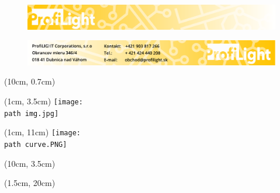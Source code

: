 \documentclass[a4paper, 12pt, onecolumn]{book}
\begin{document}
\thispagestyle{empty}										%


\newcommand{\path}{../podklady/\marking/}

\begin{figure}[t!]
	\includegraphics[width=\paperwidth]{../podklady/global/top.pdf}
\end{figure}


\begin{figure}[b!]
	\includegraphics[width=\paperwidth]{../podklady/global/bottom.pdf}
\end{figure} 

\begin{textblock*}{10cm}(10cm, 0.7cm) 	%
	\centering
  {\fontsize{30}{0} \selectfont \textbf{ \name }}
\end{textblock*}

\begin{textblock*}{7cm}(1cm, 3.5cm)
	\texttt{[image: \\path img.jpg]}
\end{textblock*}

\begin{textblock*}{7cm}(1cm, 11cm)
	\texttt{[image: \\path curve.PNG]}
\end{textblock*}

\setlength{\arrayrulewidth}{0.3mm}
\setlength{\extrarowheight}{0.3cm}

\begin{textblock*}{11cm}(10cm, 3.5cm) 												%
{
	
}
\end{textblock*}

\setlength{\arrayrulewidth}{0.3mm}
\setlength{\extrarowheight}{1mm}

\begin{textblock*}{18cm}(1.5cm, 20cm) 								%
	\centering
	{
		
	}
\end{textblock*}
\end{document}
